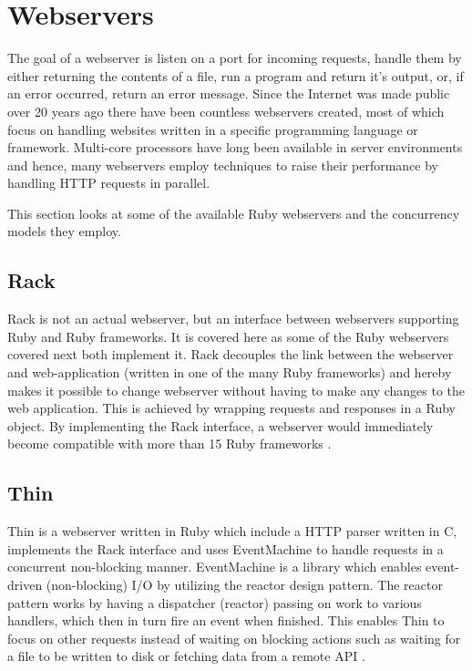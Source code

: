 \section{Webservers}
\label{webservers}

The goal of a webserver is listen on a port for incoming requests, handle them
by either returning the contents of a file, run a program and return it's
output, or, if an error occurred, return an error message. Since the Internet was
made public over 20 years ago there have been countless webservers created, most
of which focus on handling websites written in a specific programming language
or framework. Multi-core processors have long been available in server
environments and hence, many webservers employ techniques to raise their
performance by handling HTTP requests in parallel.

This section looks at some of the available Ruby webservers and the
concurrency models they employ.

\subsection{Rack}
Rack is not an actual webserver, but an interface between webservers
supporting Ruby and Ruby frameworks. It is covered here as some of the Ruby
webservers covered next both implement it. Rack decouples the link between the
webserver and web-application (written in one of the many Ruby frameworks) and
hereby makes it possible to change webserver without having to make any
changes to the web application. This is achieved by wrapping requests and
responses in a Ruby object. By implementing the Rack interface, a webserver
would immediately become compatible with more than 15 Ruby frameworks
\cite{rackspec}.

\subsection{Thin}
Thin is a webserver written in Ruby which include a HTTP parser written in C,
implements the Rack interface and uses EventMachine to handle requests in a
concurrent non-blocking manner. EventMachine is a library which enables
event-driven (non-blocking) I/O by utilizing the reactor design pattern. The
reactor pattern works by having a dispatcher (reactor) passing on work to
various handlers, which then in turn fire an event when finished. This enables
Thin to focus on other requests instead of waiting on blocking actions such as
waiting for a file to be written to disk or fetching data from a remote API
\cite{reactor}.

